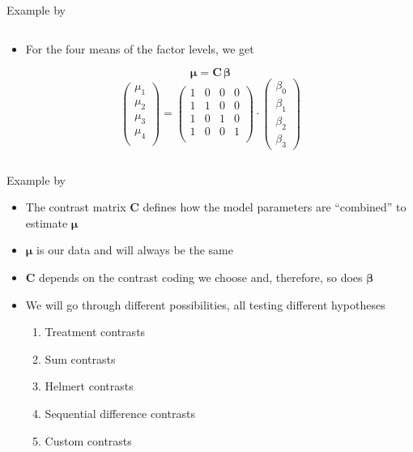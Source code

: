 \documentclass[aspectratio=169]{beamer}
\newcommand{\mat}[1]{\mathbf{#1}}
\newcommand{\gvect}[1]{\boldsymbol{#1}}
\begin{document}
\begin{frame}{Example by \citet{Schad2020}}
\begin{columns}
\begin{column}[t]{.5\textwidth}
  \begin{itemize}
    \item For the four means of the factor levels, we get
  \end{itemize}
\[
  \boldsymbol{\mu} = \mat{C} \, \gvect{\beta}
\]
\[
  \begin{pmatrix}
    \mu_1 \\
    \mu_2 \\
    \mu_3 \\
    \mu_4 \\
  \end{pmatrix} = 
  \begin{pmatrix}
    1 & 0 & 0 & 0 \\ 
    1 & 1 & 0 & 0 \\ 
    1 & 0 & 1 & 0 \\ 
    1 & 0 & 0 & 1 \\ 
  \end{pmatrix} \cdot
  \begin{pmatrix}
    \beta_0 \\
    \beta_1 \\
    \beta_2 \\
    \beta_3
  \end{pmatrix}
\]
    \end{column}
  \end{columns}
\end{frame}

\begin{frame}[<+->]{Example by \citet{Schad2020}}
  \begin{itemize}
    \item The contrast matrix $\mat{C}$ defines how the model parameters
      are ``combined'' to estimate $\boldsymbol{\mu}$
    \item $\boldsymbol{\mu}$ is our data and will always be the same
    \item $\mat{C}$ depends on the contrast coding we choose and, therefore, so
      does $\boldsymbol{\beta}$
    \item We will go through different possibilities, all testing different
      hypotheses
      \begin{enumerate}
        \item Treatment contrasts
        \item Sum contrasts
        \item Helmert contrasts
        \item Sequential difference contrasts
        \item Custom contrasts
      \end{enumerate}
  \end{itemize}
\end{frame}
\end{document}
